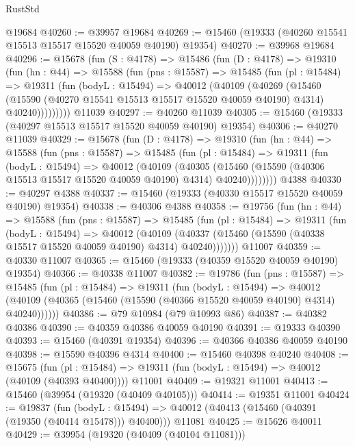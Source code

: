 \begin{lexlean}{RustStd}
\begin{coremodule}
    @19684
@40260 := @39957 @19684
@40269 := @15460 (@19333 (@40260 @15541 @15513 @15517 @15520 @40059 @40190) @19354)
@40270 := @39968 @19684
@40296 := @15678
    (fun (S : @4178) =>
    @15486
      (fun (D : @4178) =>
      @19310
        (fun (hn : @44) =>
        @15588
          (fun (pns : @15587) =>
          @15485
            (fun (pl : @15484) =>
            @19311
              (fun (bodyL : @15494) =>
              @40012
                (@40109
                  (@40269
                    (@15460
                      (@15590 (@40270 @15541 @15513 @15517 @15520 @40059 @40190) @4314)
                      @40240)))))))))
    @11039
@40297 := @40260 @11039
@40305 := @15460 (@19333 (@40297 @15513 @15517 @15520 @40059 @40190) @19354)
@40306 := @40270 @11039
@40329 := @15678
    (fun (D : @4178) =>
    @19310
      (fun (hn : @44) =>
      @15588
        (fun (pns : @15587) =>
        @15485
          (fun (pl : @15484) =>
          @19311
            (fun (bodyL : @15494) =>
            @40012
              (@40109
                (@40305
                  (@15460 (@15590 (@40306 @15513 @15517 @15520 @40059 @40190) @4314) @40240))))))))
    @4388
@40330 := @40297 @4388
@40337 := @15460 (@19333 (@40330 @15517 @15520 @40059 @40190) @19354)
@40338 := @40306 @4388
@40358 := @19756
    (fun (hn : @44) =>
    @15588
      (fun (pns : @15587) =>
      @15485
        (fun (pl : @15484) =>
        @19311
          (fun (bodyL : @15494) =>
          @40012
            (@40109
              (@40337 (@15460 (@15590 (@40338 @15517 @15520 @40059 @40190) @4314) @40240)))))))
    @11007
@40359 := @40330 @11007
@40365 := @15460 (@19333 (@40359 @15520 @40059 @40190) @19354)
@40366 := @40338 @11007
@40382 := @19786
    (fun (pns : @15587) =>
    @15485
      (fun (pl : @15484) =>
      @19311
        (fun (bodyL : @15494) =>
        @40012 (@40109 (@40365 (@15460 (@15590 (@40366 @15520 @40059 @40190) @4314) @40240))))))
@40386 := @79 @10984 (@79 @10993 @86)
@40387 := @40382 @40386
@40390 := @40359 @40386 @40059 @40190
@40391 := @19333 @40390
@40393 := @15460 (@40391 @19354)
@40396 := @40366 @40386 @40059 @40190
@40398 := @15590 @40396 @4314
@40400 := @15460 @40398 @40240
@40408 := @15675
    (fun (pl : @15484) => @19311 (fun (bodyL : @15494) => @40012 (@40109 (@40393 @40400))))
    @11001
@40409 := @19321 @11001
@40413 := @15460 (@39954 (@19320 (@40409 @40105)))
@40414 := @19351 @11001
@40424 := @19837
    (fun (bodyL : @15494) => @40012 (@40413 (@15460 (@40391 (@19350 (@40414 @15478))) @40400)))
    @11081
@40425 := @15626 @40011
@40429 := @39954 (@19320 (@40409 (@40104 @11081)))

\end{coremodule}
\end{lexlean}
